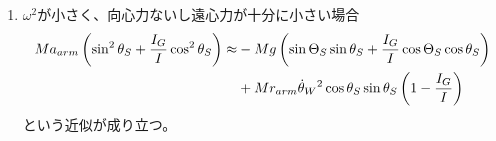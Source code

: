 \documentclass[a4paper,11pt]{jsarticle}
\begin{document}
\begin{enumerate}
  \item $\omega^2$が小さく、向心力ないし遠心力が十分に小さい場合
  \begin{align*}
    Ma_{arm}\left( \sin^2\theta_S + \frac{I_G}{I}\cos^2\theta_S \right)
    \approx 
    &- Mg\left( \sin\Theta_S \sin\theta_S + \frac{I_G}{I}\cos\Theta_S \cos\theta_S \right)  
    \notag
    \\
    &+ Mr_{arm}\dot{\theta}_W{}^2\cos\theta_S \sin\theta_S\left( 1 - \frac{I_G}{I} \right)
  \end{align*}
  という近似が成り立つ。
\end{enumerate}
\end{document}
